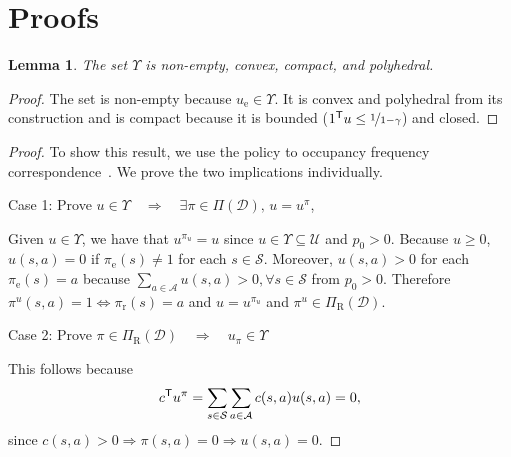 \documentclass[10pt]{article}
\renewcommand{\cite}{\citep}
\theoremstyle{plain}
\newtheorem{lemma}{Lemma}
\theoremstyle{remark}
\begin{document}
%


\clearpage
\appendix
\section{Proofs} %
\label{sec:appendix_proofs}
\begin{lemma}\label{prop:convexity_of_Upsilon}
The set $\Upsilon$ is non-empty, convex, compact, and polyhedral.
\end{lemma}
\begin{proof}
The set is non-empty because $u_{\mathrm{e}} \in \Upsilon$. It is convex and polyhedral from its construction and is compact because it is bounded ($1^{\mathsf{T}} u \le  \nicefrac{1}{1-\gamma}$) and closed.  
\end{proof}

\lemmaOccupancyExistance*
\begin{proof}
To show this result, we use the policy to occupancy frequency correspondence~\cite{Puterman1994}. We prove the two implications individually.

Case 1: Prove $u \in \Upsilon   \quad \Rightarrow \quad  \exists
        \pi \in \Pi(\mathcal{D}), \, u = u^{\pi}$,

Given $u \in \Upsilon$, we have that $u^{\pi_{u}} = u$ since $u\in \Upsilon \subseteq \mathcal{U}$ and $p_0 > 0$. Because $u \ge 0$, $u(s,a) = 0$ if $\pi_{\mathrm{e}}(s) \neq 1$ for each $s\in \mathcal{S}$. Moreover, $u(s,a) > 0$ for each $\pi_{\mathrm{e}}(s) = a$ because $\sum_{a\in \mathcal{A}} u(s,a) > 0, \forall s\in \mathcal{S}$ from $p_0 > 0$. Therefore $\pi^u(s,a) = 1 \Leftrightarrow \pi_{\mathrm{r}}(s) = a$ and $u = u^{\pi_{u}}$ and $\pi^u\in \Pi_{\mathrm{R}}(\mathcal{D})$.

Case 2: Prove $\pi \in \Pi_{\mathrm{R}}(\mathcal{D}) \quad \Rightarrow \quad  u_{\pi} \in
        \Upsilon $

        This follows because
\[
 c^{\mathsf{T}} u^{\pi} = \sum_{s\in \mathcal{S}} \sum_{a\in \mathcal{A}} c(s,a) u(s,a) = 0, 
\]
since $c(s,a) > 0 \Rightarrow \pi(s,a) = 0 \Rightarrow u(s,a) = 0$.
\end{proof}
\end{document}

